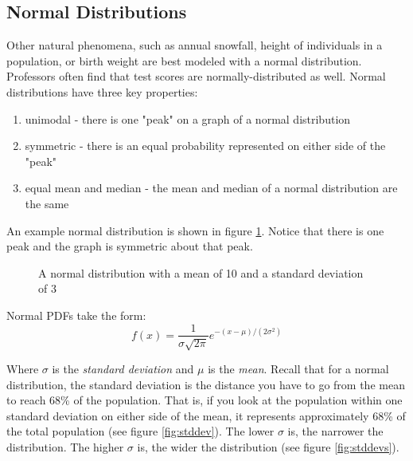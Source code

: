 \subsection{Normal Distributions}
Other natural phenomena, such as annual snowfall, height of individuals in a 
population, or birth weight are best modeled with a normal distribution. 
Professors often find that test scores are normally-distributed as well. 
Normal distributions have three key properties:
\begin{enumerate}
\item unimodal - there is one "peak" on a graph of a normal distribution
\item symmetric - there is an equal probability represented on either side of 
the "peak"
\item equal mean and median - the mean and median of a normal distribution are 
the same
\end{enumerate}

An example normal distribution is shown in figure \ref{fig:normal}. Notice 
that there is one peak and the graph is symmetric about that peak. 

\begin{figure}[H]
	\centering
    \label{fig:normal}
    \caption{A normal distribution with a mean of 10 and a standard deviation 
    of 3}
\end{figure}

Normal PDFs take the form:
$$f(x) = \frac{1}{\sigma \sqrt{2\pi}} e^{-\left(x - \mu \right)/\left(2 
\sigma^2 \right)}$$

Where $\sigma$ is the \textit{standard deviation} 
and $\mu$ is the \textit{mean}. Recall that for a normal 
distribution, the standard deviation is the distance you have to go from the 
mean to reach 68\% of the population. That is, if you look at the population 
within one standard deviation on either side of the mean, it represents 
approximately 68\% of the total population (see figure \ref{fig:stddev}). The 
lower $\sigma$ is, the narrower the distribution. The higher $\sigma$ is, the 
wider the distribution (see figure \ref{fig:stddevs}). 

